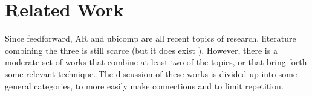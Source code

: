 \documentclass[a4paper]{article}
\begin{document}
%
%
%
%
%
%
%
%
%

\section{Related Work} \label{section_related_work}
Since feedforward, AR and ubicomp are all recent topics of research, literature combining the three is still scarce (but it does exist \cite{park2014previewable, vermeulen2009bet}). However, there is a moderate set of works that combine at least two of the topics, or that bring forth some relevant technique. The discussion of these works is divided up into some general categories, to more easily make connections and to limit repetition.
\end{document}
